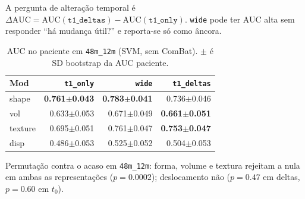 \documentclass[review]{elsarticle}
\newcommand{\code}[1]{\texttt{#1}}
\begin{document}
	A pergunta de alteração temporal é $\Delta\mathrm{AUC}=\mathrm{AUC}(\code{t1\_deltas})-\mathrm{AUC}(\code{t1\_only})$.
	\code{wide} pode ter AUC alta sem responder ``há mudança útil?'' e reporta-se só como âncora.
	
	\begin{table}[htbp]
		\centering
		\caption{AUC no paciente em \code{48m\_12m} (SVM, sem ComBat). $\pm$ é SD bootstrap da AUC paciente.}
		\label{tab:48m12_uni}
		\begin{tabular}{lrrr}
			\toprule
			Mod & \code{t1\_only} & \code{wide} & \code{t1\_deltas} \\
			\midrule
			shape   & \textbf{0.761$\pm$0.043} & \textbf{0.783$\pm$0.041} & 0.736$\pm$0.046 \\
			vol     & 0.633$\pm$0.053 & 0.671$\pm$0.049 & \textbf{0.661$\pm$0.051} \\
			texture & 0.695$\pm$0.051 & 0.761$\pm$0.047 & \textbf{0.753$\pm$0.047} \\
			disp    & 0.486$\pm$0.053 & 0.525$\pm$0.052 & 0.504$\pm$0.053 \\
			\bottomrule
		\end{tabular}
	\end{table}
	
	Permutação contra o acaso em \code{48m\_12m}: forma, volume e textura rejeitam a nula em ambas as representações ($p=0.0002$); deslocamento não ($p=0.47$ em deltas, $p=0.60$ em $t_0$).
	
\end{document}
